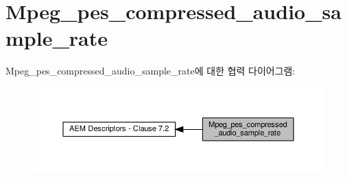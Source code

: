 \hypertarget{group__mpeg__pes__compressed__audio__sample__rate}{}\section{Mpeg\+\_\+pes\+\_\+compressed\+\_\+audio\+\_\+sample\+\_\+rate}
\label{group__mpeg__pes__compressed__audio__sample__rate}
Mpeg\+\_\+pes\+\_\+compressed\+\_\+audio\+\_\+sample\+\_\+rate에 대한 협력 다이어그램\+:
\nopagebreak
\begin{figure}[H]
\begin{center}
\leavevmode
\includegraphics[width=350pt]{group__mpeg__pes__compressed__audio__sample__rate}
\end{center}
\end{figure}
